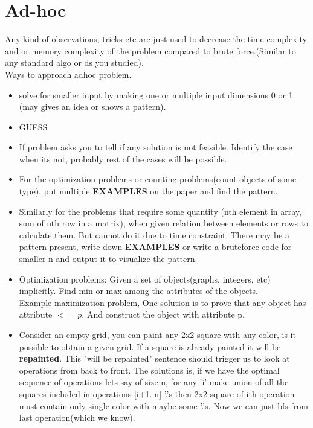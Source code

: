 \documentclass[../Notes.tex]{subfiles}
\begin{document}
\chapter{Ad-hoc}
Any kind of observations, tricks etc are just used to decrease the time complexity and or memory complexity of the problem compared to brute force.(Similar to any standard  algo or ds you studied).\\

Ways to approach adhoc problem.
\begin{itemize}
	\item solve for smaller input by making one or multiple input dimensions 0 or 1 (may gives an idea or shows a pattern).
	\item GUESS
	\item If problem asks you to tell if any solution is not feasible. Identify the case when its not, probably rest of the cases will be possible.

	\item For the optimization problems or counting problems(count objects of some type), put multiple \textbf{EXAMPLES} on the paper and find the pattern.
	\item Similarly for the problems that require some quantity (nth element in array, sum of nth row in a matrix), when given relation between elements or rows to calculate them. But cannot do it due to time constraint. There may be a pattern present, write down \textbf{EXAMPLES} or write a bruteforce code for smaller n and output it to visualize the pattern.
	\item Optimization problems: Given a set of objects(graphs, integers, etc) implicitly. Find min or max among the attributes of the objects.\\ Example maximization problem, One solution is to prove that any object has attribute $<= p$. And construct the object with attribute p.
	\item Consider an empty grid, you can paint any 2x2 square with any color, is it possible to obtain a given grid. If a square is already painted it will be \textbf{repainted}. This "will be repainted" sentence should trigger us to look at operations from back to front. The solutions is, if we have the optimal sequence of operations lets say of size n, for any 'i' make union of all the squares included in operations [i+1..n] '.'s then 2x2 square of ith operation must contain only single color with maybe some '.'s. Now we can just bfs from last operation(which we know).
\end{itemize}
\end{document}
